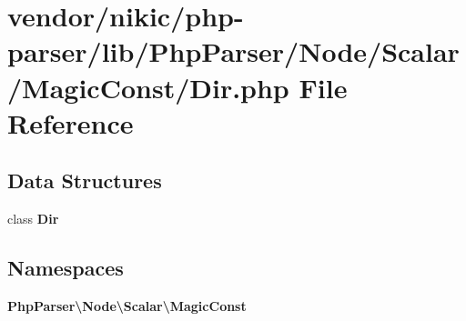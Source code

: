 \section{vendor/nikic/php-\/parser/lib/\+Php\+Parser/\+Node/\+Scalar/\+Magic\+Const/\+Dir.php File Reference}
\label{_dir_8php}
\subsection*{Data Structures}
\begin{DoxyCompactItemize}
\item 
class {\bf Dir}
\end{DoxyCompactItemize}
\subsection*{Namespaces}
\begin{DoxyCompactItemize}
\item 
 {\bf Php\+Parser\textbackslash{}\+Node\textbackslash{}\+Scalar\textbackslash{}\+Magic\+Const}
\end{DoxyCompactItemize}
